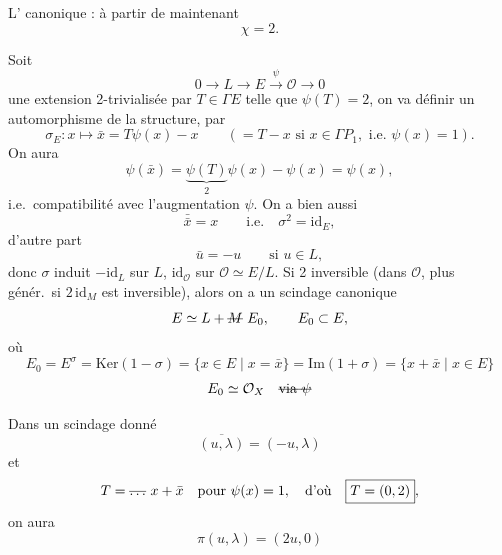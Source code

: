\documentclass[11pt,a4paper]{article}
\begin{document}
L' canonique : à partir de maintenant
\[
  \chi = 2 .
\]

Soit
\[
  0 \to L \to E \xrightarrow{\psi} \mathcal{O} \to 0
\]
une extension 2-trivialisée par $T \in \Gamma E$ telle que $\psi(T) = 2$, on va définir un automorphisme de la structure, par
\[
  \sigma_E : x \longmapsto \bar{x} = T\psi(x) - x
  \qquad (= T - x \text{ si } x \in \Gamma P_1, \text{ i.e. } \psi(x) = 1).
\]
On aura
\[
  \psi(\bar{x}) = \underbrace{\psi(T)}_{2}\psi(x) - \psi(x) = \psi(x),
\]
i.e.\ compatibilité avec l'augmentation $\psi$. On a bien aussi
\[
  \bar{\bar{x}} = x \qquad \text{i.e.} \quad \sigma^2 = \mathrm{id}_E,
\]
d'autre part
\[
  \bar{u} = -u \qquad \text{si } u \in L,
\]
donc $\sigma$ induit $-\mathrm{id}_L$ sur $L$, $\mathrm{id}_{\mathcal{O}}$ sur $\mathcal{O} \simeq E/L$.
Si 2 inversible (dans $\mathcal{O}$, plus génér.\ si $2\,\mathrm{id}_M$ est inversible), alors on a un scindage canonique
\[
  E \simeq L + \text{\struck{$M$}}\ E_0, \qquad E_0 \subset E,
\]
où
\[
  E_0 = E^{\sigma} = \mathrm{Ker}(1 - \sigma) = \{x \in E \mid x = \bar{x}\}
  = \mathrm{Im}(1 + \sigma) = \{x + \bar{x} \mid x \in E\}
\]
\[
  E_0 \simeq \mathcal{O}_X \quad \text{\struck{via $\psi$}}
\]

Dans un scindage donné
\[
  \overline{(u, \lambda)} = (-u, \lambda)
\]
et
\[
  T = \text{\struck{$\ldots$}}\ x + \bar{x} \quad \text{pour } \psi(x) = 1,
  \quad \text{d'où} \quad \boxed{T = (0, 2)},
\]
on aura
\[
  \boxed{\pi(u, \lambda) = (2u, 0)}
\]
\end{document}
